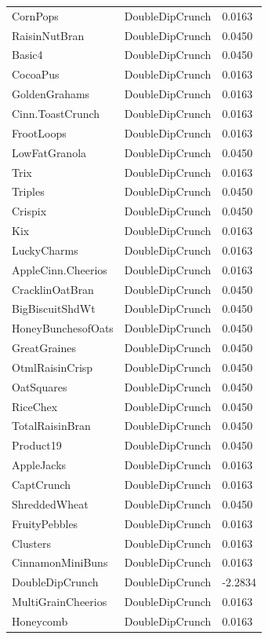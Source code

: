 \begin{table}[!htbp]
\begin{tabular}{lll}
CornPops & DoubleDipCrunch & 0.0163
\\
RaisinNutBran & DoubleDipCrunch & 0.0450
\\
Basic4 & DoubleDipCrunch & 0.0450
\\
CocoaPus & DoubleDipCrunch & 0.0163
\\
GoldenGrahams & DoubleDipCrunch & 0.0163
\\
Cinn.ToastCrunch & DoubleDipCrunch & 0.0163
\\
FrootLoops & DoubleDipCrunch & 0.0163
\\
LowFatGranola & DoubleDipCrunch & 0.0450
\\
Trix & DoubleDipCrunch & 0.0163
\\
Triples & DoubleDipCrunch & 0.0450
\\
Crispix & DoubleDipCrunch & 0.0450
\\
Kix & DoubleDipCrunch & 0.0163
\\
LuckyCharms & DoubleDipCrunch & 0.0163
\\
AppleCinn.Cheerios & DoubleDipCrunch & 0.0163
\\
CracklinOatBran & DoubleDipCrunch & 0.0450
\\
BigBiscuitShdWt & DoubleDipCrunch & 0.0450
\\
HoneyBunchesofOats & DoubleDipCrunch & 0.0450
\\
GreatGraines & DoubleDipCrunch & 0.0450
\\
OtmlRaisinCrisp & DoubleDipCrunch & 0.0450
\\
OatSquares & DoubleDipCrunch & 0.0450
\\
RiceChex & DoubleDipCrunch & 0.0450
\\
TotalRaisinBran & DoubleDipCrunch & 0.0450
\\
Product19 & DoubleDipCrunch & 0.0450
\\
AppleJacks & DoubleDipCrunch & 0.0163
\\
CaptCrunch & DoubleDipCrunch & 0.0163
\\
ShreddedWheat & DoubleDipCrunch & 0.0450
\\
FruityPebbles & DoubleDipCrunch & 0.0163
\\
Clusters & DoubleDipCrunch & 0.0163
\\
CinnamonMiniBuns & DoubleDipCrunch & 0.0163
\\
DoubleDipCrunch & DoubleDipCrunch & -2.2834
\\
MultiGrainCheerios & DoubleDipCrunch & 0.0163
\\
Honeycomb & DoubleDipCrunch & 0.0163
\\

\end{tabular}
\end{table}
